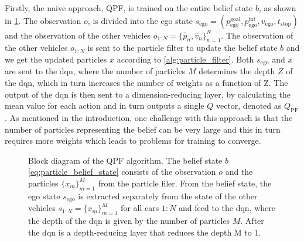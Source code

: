 Firstly, the naive approach, QPF, is trained on the entire belief state $b$, as shown in \ref{fig:qpf}. The observation $o$, is divided into the ego state $s_\mathrm{ego}= (p_\mathrm{ego}^\mathrm{goal},p_\mathrm{ego}^\mathrm{int}, v_\mathrm{ego}, t_\mathrm{stop})$ and the observation of the other vehicles $o_{1:N} = \{\hat p_n,\hat v_n \}_{n=1}^N$. The observation of the other vehicles $o_{1:N}$ is sent to the particle filter to update the belief state $b$ and we get the updated particles $x$ according to \ref{alg:particle_filter}. Both $s_\mathrm{ego}$ and $x$ are sent to the \gls{dqn}, where the number of particles $M$ determines the depth $Z$ of the \gls{dqn}, which in turn increases the number of weights as a function of Z. The output of the \gls{dqn} is then sent to a dimension-reducing layer, by calculating the mean value for each action and in turn outputs a single $Q$ vector, denoted as $Q_\mathrm{PF}$. 
As mentioned in the introduction, one challenge with this approach is that the number of particles representing the belief can be very large and this in turn requires more weights which leads to problems for training to converge. 
\begin{figure}[!h]
    \centering
        
        \caption{Block diagram of the QPF algorithm. 
        The belief state $b$ \eqref{eq:particle_belief_state} consists of the observation $o$ and the particles $\{ x_m \}^M_{m=1}$ from the particle filer. From the belief state, the ego state $s_\mathrm{ego}$ is extracted separately from the state of the other vehicles $s_{1:N}=\{ x_m \}^M_{m=1}$ for all cars $1:N$ and feed to the \gls{dqn}, where the depth of the \gls{dqn} is given by the number of particles $M$. After the \gls{dqn} is a depth-reducing layer that reduces the depth M to 1.}
    \label{fig:qpf}
\end{figure}

